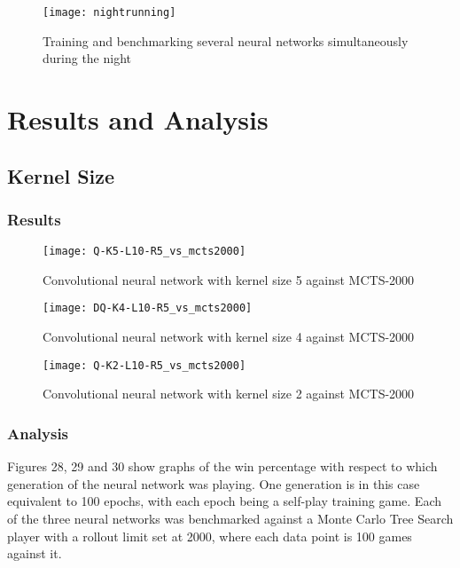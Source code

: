 \documentclass[titlepage]{article}
\begin{document}
\vskip 2cm

\begin{figure}[h]
    \center
    \texttt{[image: nightrunning]}
    \caption{Training and benchmarking several neural networks simultaneously during the night}
\end{figure}

\newpage

\section{Results and Analysis}

\subsection{Kernel Size}

\subsubsection{Results}

\vskip -0.7cm

\begin{figure}[h]
    \center
    \texttt{[image: Q-K5-L10-R5\_vs\_mcts2000]}
    \caption{Convolutional neural network with kernel size 5 against MCTS-2000}
\end{figure}

\begin{figure}[h]
    \center
    \texttt{[image: DQ-K4-L10-R5\_vs\_mcts2000]}
    \caption{Convolutional neural network with kernel size 4 against MCTS-2000}
\end{figure}

\newpage

\begin{figure}[h]
    \center
    \texttt{[image: Q-K2-L10-R5\_vs\_mcts2000]}
    \caption{Convolutional neural network with kernel size 2 against MCTS-2000}
\end{figure}

\subsubsection{Analysis}

\vskip 0.5cm

Figures 28, 29 and 30 show graphs of the win percentage with respect to which generation of the neural network was playing. One generation is in this case equivalent to 100 epochs, with each epoch being a self-play training game. Each of the three neural networks was benchmarked against a Monte Carlo Tree Search player with a rollout limit set at 2000, where each data point is 100 games against it.
\end{document}
